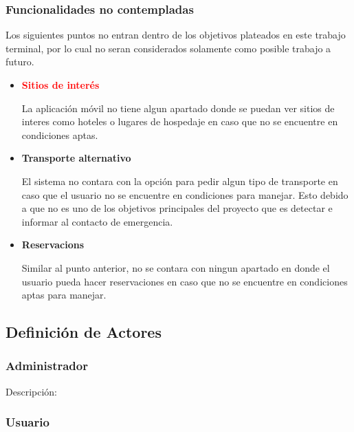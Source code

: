 	\subsubsection{Funcionalidades no contempladas}
	Los siguientes puntos no entran dentro de los objetivos plateados en este trabajo terminal, por lo cual no seran considerados solamente como posible trabajo a futuro.
		\begin{itemize}
			\item {\textbf{\textcolor{red}{Sitios de interés}} \par La aplicación móvil no tiene algun apartado donde se puedan ver sitios de interes como hoteles o lugares de hospedaje en caso que no se encuentre en condiciones aptas.}
			\item {\textbf{Transporte alternativo} \par El sistema no contara con la opción para pedir algun tipo de transporte en caso que el usuario no se encuentre en condiciones para manejar. Esto debido a que no es uno de los objetivos principales del proyecto que es detectar e informar al contacto de emergencia.}
			\item {\textbf{Reservacions} \par Similar al punto anterior, no se contara con ningun apartado en donde el usuario pueda hacer reservaciones en caso que no se encuentre en condiciones aptas para manejar.}
		\end{itemize}
\subsection{Definición de Actores}
	\subsubsection{Administrador}
	Descripción: 
	\subsubsection{Usuario}